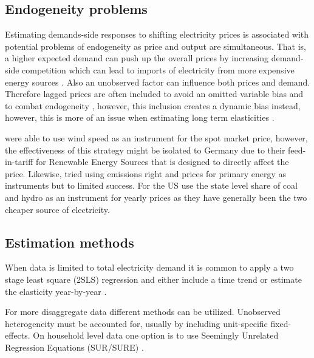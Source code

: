 \subsection{Endogeneity problems}
\label{subsec:b_endogeneity}
Estimating demands-side responses to shifting electricity prices is associated with potential problems of endogeneity as price and output are simultaneous. That is, a higher expected demand can push up the overall prices by increasing demand-side competition which can lead to imports of electricity from more expensive energy sources \citep{burke2017price}. Also an unobserved factor can influence both prices and demand. Therefore lagged prices are often included to avoid an omitted variable bias and to combat endogeneity \citep{lijesen2007real}, however, this inclusion creates a dynamic bias instead, however, this is more of an issue when estimating long term elasticities \citep{okajima2013estimation}. %
\par
\citet{bonte2015price} were able to use wind speed as an instrument for the spot market price, however, the effectiveness of this strategy might be isolated to Germany due to their feed-in-tariff for Renewable Energy Sources that is designed to directly affect the price. Likewise, \citet{graf2013measuring} tried using emissions right and prices for primary energy as instruments but to limited success. For the US \citet{burke2017price} use the state level share of coal and hydro as an instrument for yearly prices as they have generally been the two cheaper source of electricity.

\subsection{Estimation methods}
\label{subsec:b_estimation}
When data is limited to total electricity demand it is common to apply a two stage least square (2SLS) regression and either include a time trend \citep{lijesen2007real} or estimate the elasticity year-by-year \citep{bonte2015price}.
\par
For more disaggregate data different methods can be utilized. Unobserved heterogeneity must be accounted for, usually by including unit-specific fixed-effects. On household level data one option is to use Seemingly Unrelated Regression Equations (SUR/SURE) \citep{vesterberg2014residential}.

